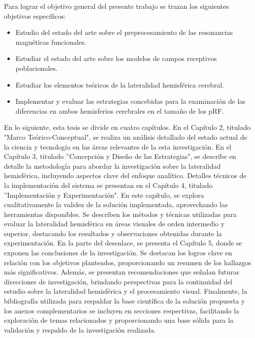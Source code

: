 \documentclass{article}
\begin{document}
	Para lograr el objetivo general del presente trabajo se
	trazan los siguientes objetivos específicos:
	
	\begin{itemize}
		\item Estudio del estado del arte sobre el preprocesamiento de las resonancias magn\'eticas funcionales.
		\item Estudiar el estado del arte sobre los modelos de campos receptivos poblacionales.
		\item Estudiar los elementos te\'oricos de la lateralidad hemisf\'erica cerebral.
		\item Implementar y evaluar las estrategias concebidas para la examinaci\'on de las diferencias en ambos hemisferios cerebrales en el tama\~no de los pRF.
	
	\end{itemize}

En lo siguiente, esta tesis se divide en cuatro capítulos.  En el Capítulo 2, titulado "Marco Teórico-Conceptual", se realiza un análisis detallado del estado actual de la ciencia y tecnología en las áreas relevantes de la esta investigaci\'on. En el Capítulo 3, titulado ''Concepción y Diseño de las Estrategias", se describe en detalle la metodología para abordar la investigación sobre la lateralidad hemisférica, incluyendo aspectos clave del enfoque analítico. Detalles técnicos de la implementación del sistema se presentan en el Capítulo 4, titulado ''Implementación y Experimentación". En este capítulo, se explora cualitativamente la validez de la solución implementada, aprovechando las herramientas disponibles. Se describen los métodos y técnicas utilizadas para evaluar la lateralidad hemisférica en áreas visuales de orden intermedio y superior, destacando los resultados y observaciones obtenidas durante la experimentación. En la parte del desenlace, se presenta el Capítulo 5, donde se exponen las conclusiones de la investigación. Se destacan los logros clave en relación con los objetivos planteados, proporcionando un resumen de los hallazgos más significativos. Además, se presentan recomendaciones que señalan futuras direcciones de investigación, brindando perspectivas para la continuidad del estudio sobre la lateralidad hemisférica y el procesamiento visual. Finalmente, la bibliografía utilizada para respaldar la base científica de la solución propuesta y los anexos complementarios se incluyen en secciones respectivas, facilitando la exploración de temas relacionados y proporcionando una base sólida para la validación y respaldo de la investigación realizada.
	
	\newpage
	
	
	
\end{document}

